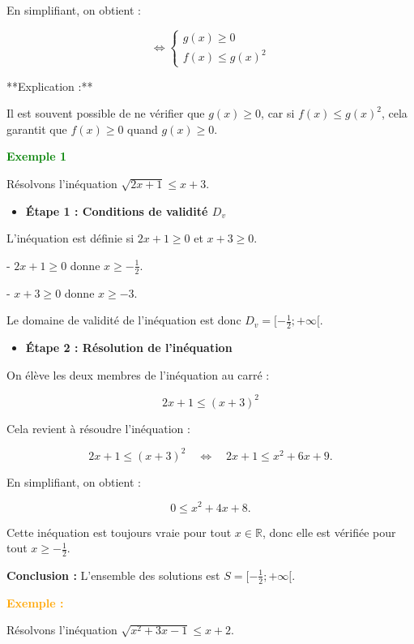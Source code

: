 \documentclass[12pt]{article}
\newcounter{exemple}
\newcommand{\exemple}{%
  \refstepcounter{exemple}%
  \textbf{\textcolor{orange}{Exemple \theexemple : }} \ignorespaces
}
\newcounter{solution}
\begin{document}
En simplifiant, on obtient :

\[
\Leftrightarrow \begin{cases}
g(x) \geq 0 \\
f(x) \leq g(x)^{2}
\end{cases}
\]

**Explication :**  

Il est souvent possible de ne vérifier que \( g(x) \geq 0 \), car si \( f(x) \leq g(x)^2 \), cela garantit que \( f(x) \geq 0 \) quand \( g(x) \geq 0 \).

\textcolor{green}{\textbf{Exemple 1}}

Résolvons l'inéquation \( \sqrt{2x+1} \leq x+3 \).

\begin{itemize}
    \item \textbf{Étape 1 : Conditions de validité \( D_v \)}
\end{itemize}

L'inéquation est définie si \( 2x + 1 \geq 0 \) et \( x + 3 \geq 0 \).

- \( 2x + 1 \geq 0 \) donne \( x \geq -\frac{1}{2} \).

- \( x + 3 \geq 0 \) donne \( x \geq -3 \).

Le domaine de validité de l'inéquation est donc \( D_v = [-\frac{1}{2}; +\infty[ \).

\begin{itemize}
    \item \textbf{Étape 2 : Résolution de l'inéquation}
\end{itemize}

On élève les deux membres de l'inéquation au carré :

\[
2x + 1 \leq (x + 3)^2
\]

Cela revient à résoudre l'inéquation :

\[
2x + 1 \leq (x + 3)^2 \quad \Leftrightarrow \quad 2x + 1 \leq x^2 + 6x + 9.
\]

En simplifiant, on obtient :

\[
0 \leq x^2 + 4x + 8.
\]

Cette inéquation est toujours vraie pour tout \( x \in \mathbb{R} \), donc elle est vérifiée pour tout \( x \geq -\frac{1}{2} \).

\textbf{Conclusion :} L'ensemble des solutions est \( S = [-\frac{1}{2}; +\infty[ \).

\textbf{\exemple}

Résolvons l'inéquation \( \sqrt{x^{2}+3x-1} \leq x+2 \).
\end{document}
